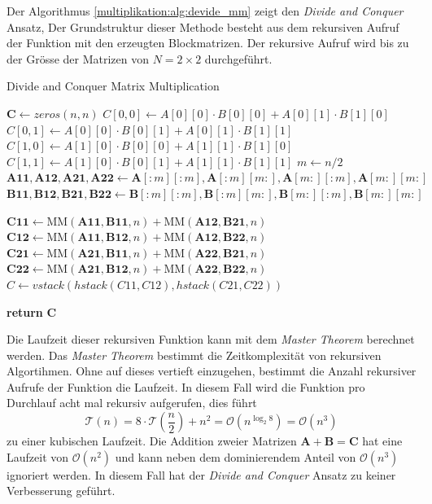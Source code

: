 Der Algorithmus \ref{multiplikation:alg:devide_mm} zeigt den \textit{Divide and Conquer} Ansatz,
Der Grundstruktur dieser Methode besteht aus dem rekursiven Aufruf der Funktion mit den erzeugten Blockmatrizen.
Der rekursive Aufruf wird bis zu der Gr\"osse der Matrizen von $N = 2 \times 2$ durchgef\"uhrt.
\begin{algorithm}\caption{Divide and Conquer Matrix Multiplication}
	\setlength{\lineskip}{7pt}
	\label{multiplikation:alg:devide_mm}
	\begin{algorithmic}
		\State  $ \mathbf{C} \gets zeros(n, n)$
		\State  $C[0, 0] \gets  A[0][0]\cdot B[0][0]+A[0][1]\cdot B[1][0]$
		\State  $C[0, 1] \gets  A[0][0]\cdot B[0][1]+A[0][1]\cdot B[1][1]$
		\State  $C[1, 0] \gets  A[1][0]\cdot B[0][0]+A[1][1]\cdot B[1][0]$
		\State  $C[1, 1] \gets  A[1][0]\cdot B[0][1]+A[1][1]\cdot B[1][1]$
		\Else
		\State  $ m \gets n/2$
		\State $\mathbf{A11}, \mathbf{A12}, \mathbf{A21}, \mathbf{A22} \gets \mathbf{A}[:m][:m], \mathbf{A}[:m][m:], \mathbf{A}[m:][:m], \mathbf{A}[m:][m:]$
		\State $\mathbf{B11}, \mathbf{B12}, \mathbf{B21}, \mathbf{B22} \gets \mathbf{B}[:m][:m], \mathbf{B}[:m][m:], \mathbf{B}[m:][:m], \mathbf{B}[m:][m:]$

		\State $\mathbf{C11} \gets \text{MM}(\mathbf{A11}, \mathbf{B11},n) + \text{MM}(\mathbf{A12}, \mathbf{B21},n)$
		\State $\mathbf{C12} \gets \text{MM}(\mathbf{A11},\mathbf{B12},n) + \text{MM}(\mathbf{A12}, \mathbf{B22},n)$
		\State $\mathbf{C21} \gets \text{MM}(\mathbf{A21}, \mathbf{B11},n) + \text{MM}(\mathbf{A22}, \mathbf{B21},n)$
		\State $\mathbf{C22} \gets \text{MM}(\mathbf{A21}, \mathbf{B12},n) + \text{MM}(\mathbf{A22}, \mathbf{B22},n)$
		\State $  C \gets vstack(hstack(C11, C12), hstack(C21, C22))$

		\EndIf
		\State \textbf{return} $\textbf{C}$

		\EndFunction
	\end{algorithmic}
\end{algorithm}

Die Laufzeit dieser rekursiven Funktion kann mit dem \textit{Master Theorem} \cite{multiplikation:master_theorem} berechnet werden. Das \textit{Master Theorem} bestimmt die Zeitkomplexit\"at von rekursiven Algortihmen.
Ohne auf dieses vertieft einzugehen, bestimmt die Anzahl rekursiver Aufrufe der Funktion die Laufzeit.
In diesem Fall wird die Funktion pro Durchlauf acht mal rekursiv aufgerufen, dies f\"uhrt
\begin{equation} \label{multiplikation:eq:laufzeitdac}
	\mathcal{T}(n) =	8 \cdot \mathcal{T}\left (\frac{n}{2}\right ) + n^2  = \mathcal{O}(n^{\log_2 8}) = \mathcal{O}\left (n^{3} \right )
\end{equation}
zu einer kubischen Laufzeit.
Die Addition zweier Matrizen $\mathbf{A} + \mathbf{B} = \mathbf{C}$ hat eine Laufzeit von $\mathcal{O}(n^{2})$ und kann neben dem dominierendem Anteil von $\mathcal{O}(n^{3})$ ignoriert werden.
In diesem Fall hat der \textit{Divide and Conquer} Ansatz zu keiner Verbesserung gef\"uhrt.


